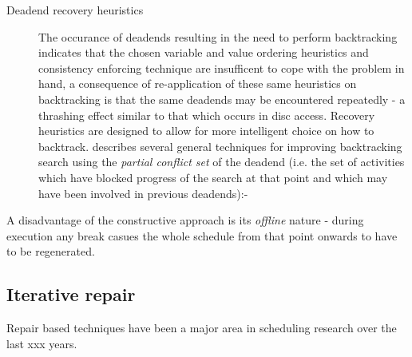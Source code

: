 \begin{description}
\item[Deadend recovery heuristics] 
The occurance of deadends resulting in the need to perform backtracking indicates that the chosen variable and value ordering heuristics and consistency enforcing technique are insufficent to cope with the problem in hand, a consequence of re-application of these same heuristics on backtracking is that the same deadends may be encountered repeatedly - a thrashing effect similar to that which occurs in disc access. Recovery heuristics are designed to allow for more intelligent choice on how to backtrack. \cite{sadeh94backtracking} describes several general techniques for improving backtracking search using the \emph{partial conflict set} of the deadend (i.e. the set of activities which have blocked progress of the search at that point and which may have been involved in previous deadends):- 

\end{description}

A disadvantage of the constructive approach is its \emph{offline} nature - during execution any break casues the whole schedule from that point onwards to have to be regenerated.




%
%
\subsection{Iterative repair}
Repair based techniques have been a major area in scheduling research over the last xxx years. 

